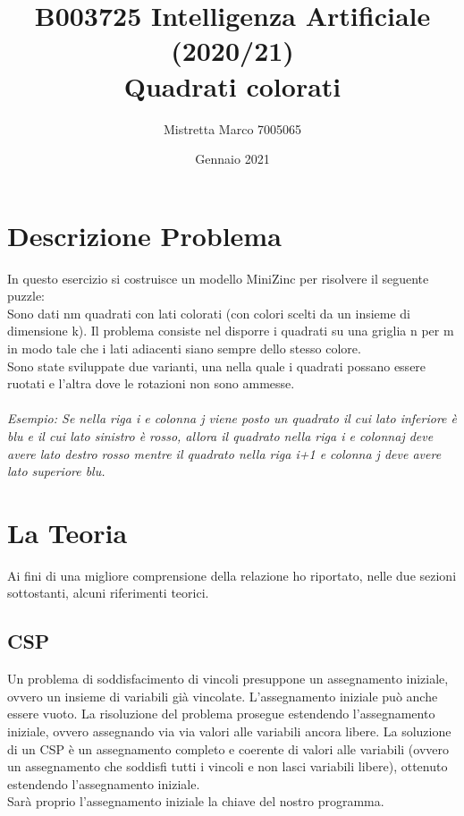 \documentclass{article}
\title{\huge{B003725 Intelligenza Artificiale (2020/21)}\\Quadrati colorati}
\author{Mistretta Marco 7005065}
\date{Gennaio 2021}
\begin{document}
\maketitle
\tableofcontents

\newpage
\section{Descrizione Problema}
In questo esercizio si costruisce un modello MiniZinc per risolvere il seguente puzzle:\\
Sono dati nm quadrati con lati colorati (con colori scelti da un insieme di dimensione k). 
Il problema consiste nel disporre i quadrati su una griglia n per m in modo tale che i lati adiacenti siano sempre dello stesso colore.\\
Sono state sviluppate due varianti, una nella
quale i quadrati possano essere ruotati e l’altra dove le rotazioni non sono ammesse.
\\\\
\textit{Esempio:
Se nella riga i e colonna j viene posto un quadrato il cui lato inferiore è blu e il cui lato sinistro è rosso, 
allora il quadrato nella riga i e colonnaj deve avere lato destro rosso mentre il quadrato nella riga i+1 e colonna j deve avere lato superiore blu.} 


\section{La Teoria}
Ai fini di una migliore comprensione della relazione ho riportato, nelle due sezioni sottostanti, alcuni riferimenti teorici.
\subsection{CSP}
Un problema di soddisfacimento di vincoli presuppone un assegnamento iniziale, ovvero un insieme di variabili già vincolate. L'assegnamento iniziale può anche essere vuoto. La risoluzione del problema prosegue estendendo l'assegnamento iniziale, ovvero assegnando via via valori alle variabili ancora libere. La soluzione di un CSP è un assegnamento completo e coerente di valori alle variabili (ovvero un assegnamento che soddisfi tutti i vincoli e non lasci variabili libere), ottenuto estendendo l'assegnamento iniziale.\\
Sarà proprio l'assegnamento iniziale la chiave del nostro programma.
\end{document}
